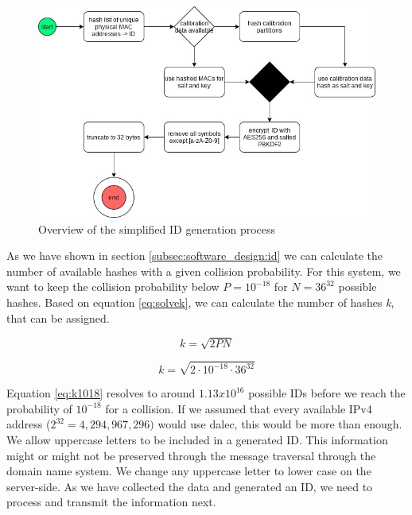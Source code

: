      \begin{figure}
         \centering
         \includegraphics[width=\textwidth]{latex/figures/id_generation.jpg}
         \caption{Overview of the simplified ID generation process}
         \label{fig:id_gen}
     \end{figure}
    
     As we have shown in section \ref{subsec:software_design:id} we can calculate the number of available hashes with a given collision probability. For this system, we want to keep the collision probability below $P = 10^{-18}$ for $N = 36^{32}$ possible hashes.
     Based on equation \ref{eq:solvek}, we can calculate the number of hashes \textit{k}, that can be assigned.
     
     \begin{equation*}
         k = \sqrt{2PN}
     \end{equation*}
     
     \begin{equation}
        \label{eq:k1018}
         k = \sqrt{2 \cdot  10^{-18} \cdot 36^{32}}
     \end{equation}
     
\newpage     

     Equation \ref{eq:k1018} resolves to around $1.13x10^{16}$ possible IDs before we reach the probability of $10^{-18}$ for a collision. If we assumed that every available IPv4 address ($2^{32} = 4,294,967,296)$ would use dalec, this would be more than enough.\\
     
     We allow uppercase letters to be included in a generated ID. This information might or might not be preserved through the message traversal through the domain name system. We change any uppercase letter to lower case on the server-side. 
     As we have collected the data and generated an ID, we need to process and transmit the information next.
     
